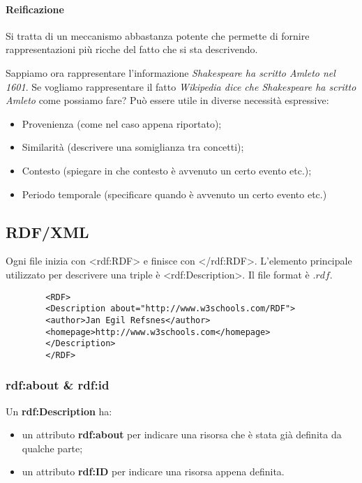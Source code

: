 \paragraph{Reificazione}
Si tratta di un meccanismo abbastanza potente che permette di fornire rappresentazioni più ricche del fatto che si sta descrivendo.
\begin{info}
	Sappiamo ora rappresentare l'informazione \textit{Shakespeare ha scritto Amleto nel 1601}. Se vogliamo rappresentare il fatto \textit{Wikipedia dice che Shakespeare ha scritto Amleto} come possiamo fare?
	Può essere utile in diverse necessità espressive:
	\begin{itemize}
		\item Provenienza (come nel caso appena riportato);
		\item Similarità (descrivere una somiglianza tra concetti);
		\item Contesto (spiegare in che contesto è avvenuto un certo evento etc.);
		\item Periodo temporale (specificare quando è avvenuto un certo evento etc.)
	\end{itemize}
\end{info}

\subsection{RDF/XML}
Ogni file inizia con <rdf:RDF> e finisce con </rdf:RDF>. L'elemento principale utilizzato per descrivere una triple è <rdf:Description>. Il file format è $.rdf$.
\begin{info}[Esempio]
	\begin{verbatim}
		<RDF>
		<Description about="http://www.w3schools.com/RDF">
		<author>Jan Egil Refsnes</author>
		<homepage>http://www.w3schools.com</homepage>
		</Description>
		</RDF>
	\end{verbatim}
\end{info}

\subsubsection{rdf:about \& rdf:id}
Un \textbf{rdf:Description} ha:
\begin{itemize}
	\item un attributo \textbf{rdf:about} per indicare una risorsa che è stata già definita da qualche parte;
	\item un attributo \textbf{rdf:ID} per indicare una risorsa appena definita.
\end{itemize}

